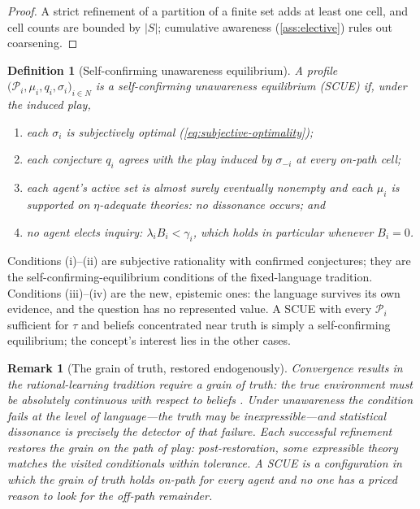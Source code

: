 \documentclass[11pt]{article}
\newtheorem{definition}[assumption]{Definition}
\newtheorem{remark}[assumption]{Remark}
\begin{document}
\begin{proof}
A strict refinement of a partition of a finite set adds at least one cell,
and cell counts are bounded by $|S|$; cumulative awareness
(\cref{ass:elective}) rules out coarsening.
\end{proof}

\begin{definition}[Self-confirming unawareness equilibrium]
\label{def:scue}
A profile
$\bigl(\mathcal P_i,\mu_i,q_i,\sigma_i\bigr)_{i\in N}$ is a
\emph{self-confirming unawareness equilibrium} (SCUE) if, under the induced
play,
\begin{enumerate}[label=(\roman*)]
  \item each $\sigma_i$ is subjectively optimal
  (\cref{eq:subjective-optimality});
  \item each conjecture $q_i$ agrees with the play induced by
  $\sigma_{-i}$ at every on-path cell;
  \item each agent's active set is almost surely eventually nonempty and each
  $\mu_i$ is supported on $\eta$-adequate theories: no dissonance occurs; and
  \item no agent elects inquiry: $\lambda_iB_i<\gamma_i$, which holds in
  particular whenever $B_i=0$.
\end{enumerate}
\end{definition}

Conditions (i)--(ii) are subjective rationality with confirmed conjectures;
they are the self-confirming-equilibrium conditions of the fixed-language
tradition.  Conditions (iii)--(iv) are the new, epistemic ones: the language
survives its own evidence, and the question has no represented value.  A SCUE
with every $\mathcal P_i$ sufficient for $\tau$ and beliefs concentrated near
truth is simply a self-confirming equilibrium; the concept's interest lies in
the other cases.

\begin{remark}[The grain of truth, restored endogenously]
\label{rem:grain}
Convergence results in the rational-learning tradition require a grain of
truth: the true environment must be absolutely continuous with respect to
beliefs \citep{KalaiLehrer1993a}.  Under unawareness the condition fails at
the level of language---the truth may be inexpressible---and statistical
dissonance is precisely the detector of that failure.  Each successful
refinement restores the grain \emph{on the path of play}: post-restoration,
some expressible theory matches the visited conditionals within tolerance.
A SCUE is a configuration in which the grain of truth holds on-path for every
agent and no one has a priced reason to look for the off-path remainder.
\end{remark}
\end{document}
